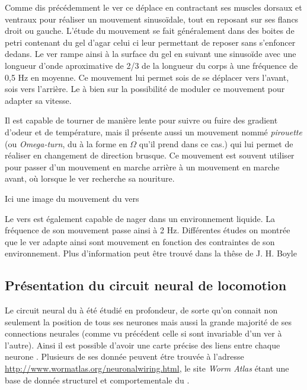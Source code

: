 Comme dis précédemment le ver ce déplace en contractant ses muscles dorsaux et
ventraux pour réaliser un mouvement sinusoïdale, tout en reposant sur ses
flancs droit ou gauche. L'étude du mouvement se fait généralement dans des
boites de petri contenant du gel d'agar celui ci leur permettant de reposer
sans s'enfoncer dedans. Le ver rampe ainsi à la surface du gel en suivant une
sinusoïde avec une longueur d'onde aproximative de 2/3 de la longueur du corps
à une fréquence de 0,5 Hz en moyenne\cite{Boyle2009}. Ce mouvement lui permet
sois de se déplacer vers l'avant, sois vers l'arrière. Le \celeg{} à bien sur
la possibilité de moduler ce mouvement pour adapter sa vitesse.

Il est capable de tourner de manière lente pour suivre ou fuire des gradient
d'odeur et de température, mais il présente aussi un mouvement nommé
\textit{pirouette} (ou \textit{Omega-turn}, du à la forme en $\Omega$ qu'il
prend dans ce cas.) qui lui permet de réaliser en changement de direction
brusque. Ce mouvement est souvent utiliser pour passer d'un mouvement en marche
arrière à un mouvement en marche avant, où lorsque le ver recherche sa
nouriture.\\

\begin{center}
   Ici une image du mouvement du vers
\end{center}

Le vers est également capable de nager dans un environnement liquide. La fréquence
de son mouvement passe ainsi à 2 Hz. Différentes études on montrée que le ver
adapte ainsi sont mouvement en fonction des contraintes de son environnement.
Plus d'information peut être trouvé dans la thêse de J. H. Boyle \cite{Boyle2009}


\subsection{Présentation du circuit neural de locomotion} %
\label{sub:Présentation du circuit neural de locomotion}

Le circuit neural du \celeg{} à été étudié en profondeur, de sorte qu'on
connait non seulement la position de tous ses neurones mais aussi la grande
majorité de ses connections neurales (comme vu précédent celle si sont
invariable d'un ver à l'autre).  Ainsi il est possible d'avoir une carte
précise des liens entre chaque neurone
\cite{Durbin1987,Chen2006,Boyle2009,Varshney2011}.  Plusieurs de ses donnée
peuvent étre trouvée à l'adresse
\url{http://www.wormatlas.org/neuronalwiring.html}, le site \textit{Worm Atlas}
étant une base de donnée structurel et comportementale du \celeg{}.

